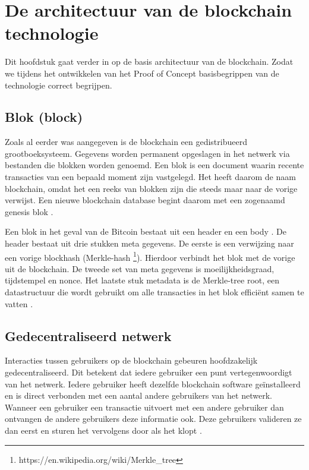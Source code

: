 \chapter{De architectuur van de blockchain technologie}
Dit hoofdstuk gaat verder in op de basis architectuur van de blockchain. Zodat we tijdens het ontwikkelen van het Proof of Concept basisbegrippen van de technologie correct begrijpen.

\section{Blok (block)}
Zoals al eerder was aangegeven is de blockchain een gedistribueerd grootboeksysteem. Gegevens worden permanent opgeslagen in het netwerk via bestanden die blokken worden genoemd. Een blok is een document waarin recente transacties van een bepaald moment zijn vastgelegd. Het heeft daarom de naam blockchain, omdat het een reeks van blokken zijn die steeds maar naar de vorige verwijst. Een nieuwe blockchain database begint daarom met een zogenaamd genesis blok \cite{blochchainTechSymmbioticDev}.\par

Een blok in het geval van de Bitcoin bestaat uit een header en een body \cite{blockchainIssuesAndChallenges}. De header bestaat uit drie stukken meta gegevens. De eerste is een verwijzing naar een vorige blockhash (Merkle-hash \footnote{https://en.wikipedia.org/wiki/Merkle\_tree}). Hierdoor verbindt het blok met de vorige uit de blockchain. De tweede set van meta gegevens is moeilijkheidsgraad, tijdstempel en nonce. Het laatste stuk metadata is de Merkle-tree root, een datastructuur die wordt gebruikt om alle transacties in het blok efficiënt samen te vatten \cite{masteringBitcoin}.

\section{Gedecentraliseerd netwerk}
Interacties tussen gebruikers op de blockchain gebeuren hoofdzakelijk gedecentraliseerd. Dit betekent dat iedere gebruiker een punt vertegenwoordigt van het netwerk. Iedere gebruiker heeft dezelfde blockchain software geïnstalleerd en is direct verbonden met een aantal andere gebruikers van het netwerk. Wanneer een gebruiker een transactie uitvoert met een andere gebruiker dan ontvangen de andere gebruikers deze informatie ook. Deze gebruikers valideren ze dan eerst en sturen het vervolgens door als het klopt \cite {challengesOppertunities}.\par

